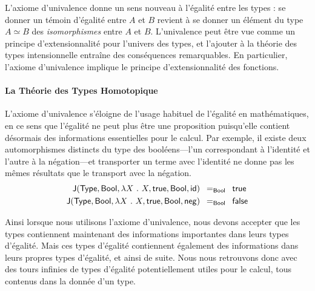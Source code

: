 L'axiome d'univalence donne un sens nouveau à l'égalité entre les types : 
% 
% 
se donner un témoin d'égalité entre \( A \) et \( B \) revient à se donner un 
élément du type \( A \simeq B \) des \emph{isomorphismes} entre \( A \) et \( B \). 
% 
L'univalence peut être vue comme un principe d'extensionnalité pour l'univers 
des types, et l'ajouter à la théorie des types intensionnelle entraîne des 
conséquences remarquables. 
% 
En particulier, l'axiome d'univalence implique le principe d'extensionnalité des 
fonctions.

\paragraph*{La Théorie des Types Homotopique}
% 
L'axiome d'univalence s'éloigne de l'usage habituel de l'égalité en mathématiques,
en ce sens que l'égalité ne peut plus être une proposition puisqu'elle contient 
désormais des informations essentielles pour le calcul.  
% 
Par exemple, il existe deux automorphismes distincts du type des booléens---l'un 
correspondant à l'identité et l'autre à la négation---et transporter un terme avec 
l'identité ne donne pas les mêmes résultats que le transport avec la négation.
% 
\[
\begin{split}
\indJ{\varType}{\mathsf{Bool}}{\lambda X\ .\ X}{\mathsf{true}}{\mathsf{Bool}}{\mathsf{id}} & \enskip =_{\mathsf{Bool}} \enskip \mathsf{true} \\
\indJ{\varType}{\mathsf{Bool}}{\lambda X\ .\ X}{\mathsf{true}}{\mathsf{Bool}}{\mathsf{neg}} & \enskip =_{\mathsf{Bool}} \enskip \mathsf{false}
\end{split}
\]

Ainsi lorsque nous utilisons l'axiome d'univalence, nous devons accepter que 
les types contiennent maintenant des informations importantes dans leurs types 
d'égalité. 
% 
Mais ces types d'égalité contiennent également des informations dans leurs 
propres types d'égalité, et ainsi de suite. 
% 
Nous nous retrouvons donc avec des tours infinies de types d'égalité 
potentiellement utiles pour le calcul, tous contenus dans la donnée d'un type.

